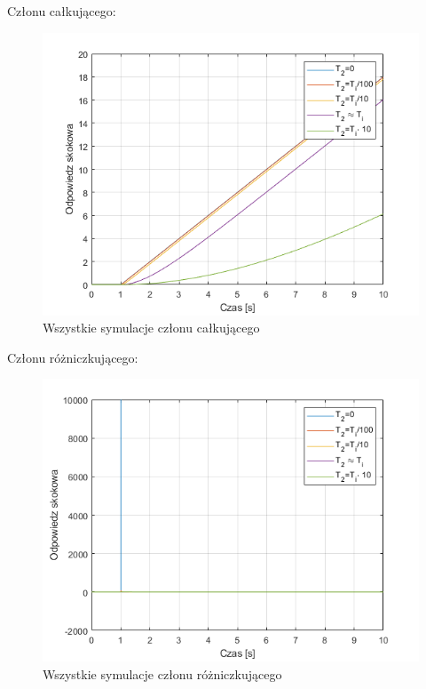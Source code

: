 \documentclass{article}
\begin{document}
\vspace{-2ex}

Członu całkującego:
\begin{figure}[h!]
    \centering
    \includegraphics[scale=0.5]{all_calkujacy.png}
    \caption{Wszystkie symulacje członu całkującego}
    \label{fig:all_calkujacy}
\end{figure}


\vspace{-2ex}

Członu różniczkującego:
\begin{figure}[h!]
    \centering
    \includegraphics[scale=0.5]{all_rozniczkujacy.png}
    \caption{Wszystkie symulacje członu różniczkującego}
    \label{fig:all_rozniczkujacy}
\end{figure}
\end{document}
